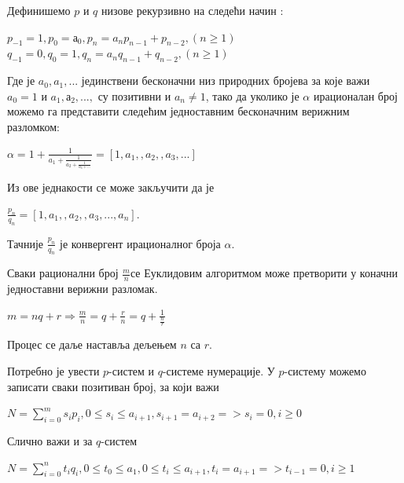 \documentclass[a4paper]{article}
\begin{document}
Дефинишемо $ p $ и $ q $ низове рекурзивно на следећи начин :

\begin{center}
	$ p_{-1} = 1, p_{0} = а_{0}, p_{n} = a_{n}p_{n-1} + p_{n-2}, (n \geq 1 ) $\\
	$ q_{-1} = 0, q_{0} = 1, q_{n} = a_{n}q_{n-1} + q_{n-2}, (n \geq 1 ) $
\end{center}

Где је $ a_{0}, a_{1}, ... $ јединствени бесконачни низ природних бројева за које важи $ a_{0} = 1 $ и $ a_{1}, а_{2}, ... ,  $ су позитивни и $ a_{n} \ne 1 $, тако да уколико је $ \alpha $ ирационалан број можемо га представити следећим једноставним бесконачним верижним разломком:

\begin{center}
		$ \alpha = 1 + \frac{1}{a_{1} + \frac{1}{a_{2} + \frac{1}{a_{3} + ...}}} = [1, a_{1}, , a_{2}, , a_{3}, ...] $ 
\end{center}

Из ове једнакости се може закључити да је 
\begin{center}
	$ \frac{p_{n}}{q_{n}} = [1, a_{1}, , a_{2}, , a_{3}, ..., a_{n}] $.
\end{center}

Тачније $ \frac{p_{n}}{q_{n}} $ је конвергент ирационалног броја $ \alpha $. 

Сваки рационални број $ \frac{m}{n} $се Еуклидовим алгоритмом може претворити у коначни једноставни верижни разломак.

\begin{center}
	$ m = nq + r \Rightarrow
	  \frac{m}{n} = q + \frac{r}{n} = q + \frac{1}{\frac{n}{r}} $
\end{center}
Процес се даље наставља дељењем $ n $ са $ r $.

Потребно је увести $ p $-систем и $ q $-системе нумерације. 
У $ p $-систему можемо записати сваки позитиван број, за који важи 

\begin{center}
	$ N = \sum_{i=0}^{m} s_{i}p_{i}, 0 \le s_{i} \le a_{i+1}, s_{i+1} = a_{i+2} => s_{i}=0 , i \ge 0 $
\end{center}

Слично важи и за $ q $-систем

\begin{center}
	$ N = \sum_{i=0}^{n} t_{i}q_{i}, 0 \le t_{0} \le a_{1}, 0 \le t_{i} \le a_{i+1}, t_{i} = a_{i+1} => t_{i-1}=0 , i \ge 1 $
\end{center}
\end{document}
